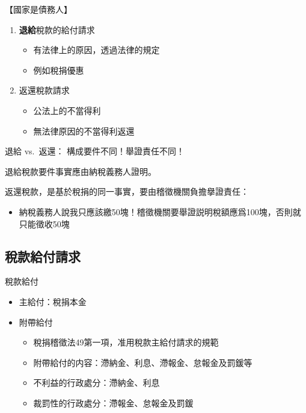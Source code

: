 \documentclass[]{ctexbook}
\providecommand{\tightlist}{%
  \setlength{\itemsep}{0pt}\setlength{\parskip}{0pt}}
\begin{document}
【國家是債務人】

\begin{enumerate}
\def\labelenumi{\arabic{enumi}.}
\setcounter{enumi}{2}
\tightlist
\item
  \textbf{退給}稅款的給付請求

  \begin{itemize}
  \tightlist
  \item
    有法律上的原因，透過法律的規定
  \item
    例如稅捐優惠
  \end{itemize}
\item
  返還稅款請求

  \begin{itemize}
  \tightlist
  \item
    公法上的不當得利
  \item
    無法律原因的不當得利返還
  \end{itemize}
\end{enumerate}

退給 vs.~返還：
構成要件不同！舉證責任不同！

退給稅款要件事實應由納稅義務人證明。

返還稅款，是基於稅捐的同一事實，要由稽徵機關負擔擧證責任：

\begin{itemize}
\tightlist
\item
  納稅義務人說我只應該繳50塊！稽徵機關要舉證説明稅額應爲100塊，否則就只能徵收50塊
\end{itemize}

\hypertarget{ux7a05ux6b3eux7d66ux4ed8ux8acbux6c42}{%
\subsection{稅款給付請求}\label{ux7a05ux6b3eux7d66ux4ed8ux8acbux6c42}}

稅款給付

\begin{itemize}
\tightlist
\item
  主給付：稅捐本金
\item
  附帶給付

  \begin{itemize}
  \tightlist
  \item
    稅捐稽徵法49第一項，准用稅款主給付請求的規範
  \item
    附帶給付的内容：滯納金、利息、滯報金、怠報金及罰鍰等
  \item
    不利益的行政處分：滯納金、利息
  \item
    裁罰性的行政處分：滯報金、怠報金及罰鍰
  \end{itemize}
\end{itemize}
\end{document}
